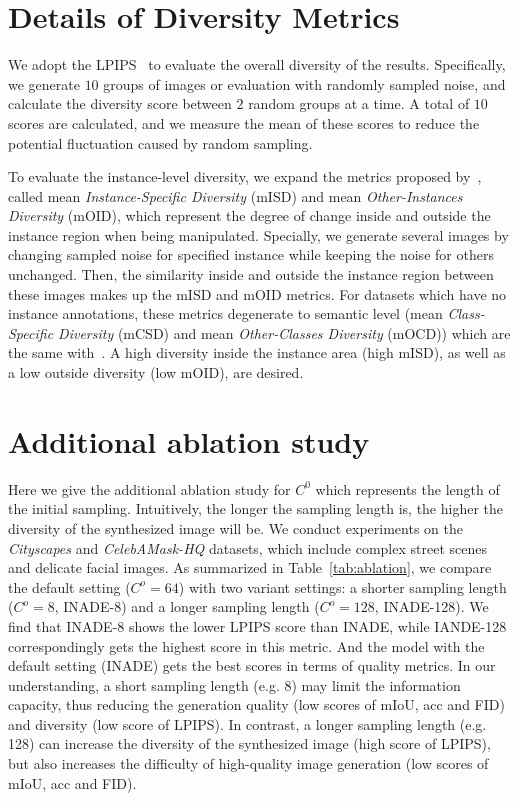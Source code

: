 \documentclass[final]{cvpr}
\begin{document}
\section{Details of Diversity Metrics}
We adopt the LPIPS~\cite{zhang2018unreasonable,github-lpips} to evaluate the overall diversity of the results. Specifically, we generate $10$ groups of images or evaluation with randomly sampled noise, and calculate the diversity score between $2$ random groups at a time. A total of $10$ scores are calculated, and we measure the mean of these scores to reduce the potential fluctuation caused by random sampling.

To evaluate the instance-level diversity, we expand the metrics proposed by~\cite{zhu2020semantically}, called mean \textit{Instance-Specific Diversity} (mISD) and mean \textit{Other-Instances Diversity} (mOID), which represent the degree of change inside and outside the instance region when being manipulated. Specially, we generate several images by changing sampled noise for specified instance while keeping the noise for others unchanged. Then, the similarity inside and outside the instance region between these images makes up the mISD and mOID metrics. For datasets which have no instance annotations, these metrics degenerate to semantic level (mean \textit{Class-Specific Diversity} (mCSD) and mean \textit{Other-Classes Diversity} (mOCD)) which are the same with~\cite{zhu2020semantically}. A high diversity inside the instance area (high mISD), as well as a low outside diversity (low mOID), are desired.

\section{Additional ablation study}
Here we give the additional ablation study for $C^0$ which represents the length of the initial sampling. Intuitively, the longer the sampling length is, the higher the diversity of the synthesized image will be. We conduct experiments on the \textit{Cityscapes} and \textit{CelebAMask-HQ} datasets, which include complex street scenes and delicate facial images. As summarized in Table~\ref{tab:ablation}, we compare the default setting ($C^o=64$) with two variant settings: a shorter sampling length ($C^o=8$, INADE-8) and a longer sampling length ($C^o=128$, INADE-128). We find that INADE-8 shows the lower LPIPS score than INADE, while IANDE-128 correspondingly gets the highest score in this metric. And the model with the default setting (INADE) gets the best scores in terms of quality metrics. In our understanding, a short sampling length (e.g. 8) may limit the information capacity, thus reducing the generation quality (low scores of mIoU, acc and FID) and diversity (low score of LPIPS). In contrast, a longer sampling length (e.g. 128) can increase the diversity of the synthesized image (high score of LPIPS), but also increases the difficulty of high-quality image generation (low scores of mIoU, acc and FID). 
\end{document}

